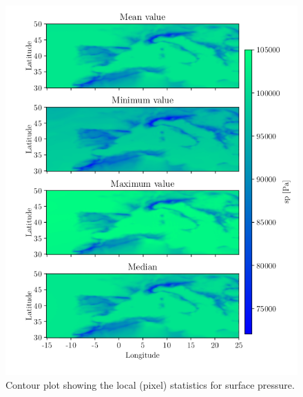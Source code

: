\begin{figure}[ht]
    \centering
    \includegraphics{python_figs/all_stat_variable_sp.png}
    \caption{Contour plot showing the local (pixel) statistics for surface pressure.}
    \label{fig:all_stats_sp}
\end{figure}
